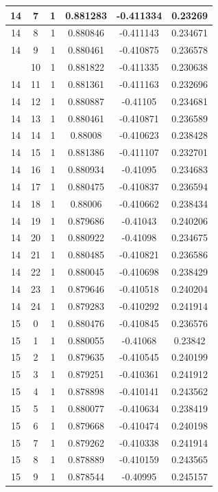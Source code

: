 \documentclass[12pt,a4paper]{article}
\numberwithin{equation}{section}
\numberwithin{figure}{section}
\numberwithin{table}{section}
\begin{document}
\begin{longtable}{|c|c|c|c|c|c|}
14 & 7 & 1 & 0.881283 & -0.411334 & 0.23269 \\ \hline
14 & 8 & 1 & 0.880846 & -0.411143 & 0.234671 \\ \hline
14 & 9 & 1 & 0.880461 & -0.410875 & 0.236578 \\ \hline
\pagebreak
14 & 10 & 1 & 0.881822 & -0.411335 & 0.230638 \\ \hline
14 & 11 & 1 & 0.881361 & -0.411163 & 0.232696 \\ \hline
14 & 12 & 1 & 0.880887 & -0.41105 & 0.234681 \\ \hline
14 & 13 & 1 & 0.880461 & -0.410871 & 0.236589 \\ \hline
14 & 14 & 1 & 0.88008 & -0.410623 & 0.238428 \\ \hline
14 & 15 & 1 & 0.881386 & -0.411107 & 0.232701 \\ \hline
14 & 16 & 1 & 0.880934 & -0.41095 & 0.234683 \\ \hline
14 & 17 & 1 & 0.880475 & -0.410837 & 0.236594 \\ \hline
14 & 18 & 1 & 0.88006 & -0.410662 & 0.238434 \\ \hline
14 & 19 & 1 & 0.879686 & -0.41043 & 0.240206 \\ \hline
14 & 20 & 1 & 0.880922 & -0.41098 & 0.234675 \\ \hline
14 & 21 & 1 & 0.880485 & -0.410821 & 0.236586 \\ \hline
14 & 22 & 1 & 0.880045 & -0.410698 & 0.238429 \\ \hline
14 & 23 & 1 & 0.879646 & -0.410518 & 0.240204 \\ \hline
14 & 24 & 1 & 0.879283 & -0.410292 & 0.241914 \\ \hline
15 & 0 & 1 & 0.880476 & -0.410845 & 0.236576 \\ \hline
15 & 1 & 1 & 0.880055 & -0.41068 & 0.23842 \\ \hline
15 & 2 & 1 & 0.879635 & -0.410545 & 0.240199 \\ \hline
15 & 3 & 1 & 0.879251 & -0.410361 & 0.241912 \\ \hline
15 & 4 & 1 & 0.878898 & -0.410141 & 0.243562 \\ \hline
15 & 5 & 1 & 0.880077 & -0.410634 & 0.238419 \\ \hline
15 & 6 & 1 & 0.879668 & -0.410474 & 0.240198 \\ \hline
15 & 7 & 1 & 0.879262 & -0.410338 & 0.241914 \\ \hline
15 & 8 & 1 & 0.878889 & -0.410159 & 0.243565 \\ \hline
15 & 9 & 1 & 0.878544 & -0.40995 & 0.245157 \\ \hline

\end{longtable}
\end{document}
